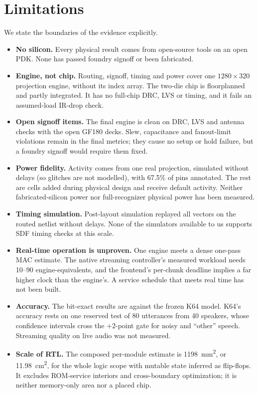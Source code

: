 \section{Limitations}
\label{sec:limitations}

We state the boundaries of the evidence explicitly.

\begin{itemize}
\item \textbf{No silicon.} Every physical result comes from open-source tools on an open PDK. None has passed foundry signoff or been fabricated.
\item \textbf{Engine, not chip.} Routing, signoff, timing and power cover one $1280\times320$ projection engine, without its index array. The two-die chip is floorplanned and partly integrated. It has no full-chip DRC, LVS or timing, and it fails an assumed-load IR-drop check.
\item \textbf{Open signoff items.} The final engine is clean on DRC, LVS and antenna checks with the open GF180 decks. Slew, capacitance and fanout-limit violations remain in the final metrics; they cause no setup or hold failure, but a foundry signoff would require them fixed.
\item \textbf{Power fidelity.} Activity comes from one real projection, simulated without delays (so glitches are not modelled), with 67.5\% of pins annotated. The rest are cells added during physical design and receive default activity. Neither fabricated-silicon power nor full-recognizer physical power has been measured.
\item \textbf{Timing simulation.} Post-layout simulation replayed all vectors on the routed netlist without delays. None of the simulators available to us supports SDF timing checks at this scale.
\item \textbf{Real-time operation is unproven.} One engine meets a dense one-pass MAC estimate. The native streaming controller's measured workload needs 10--90 engine-equivalents, and the frontend's per-chunk deadline implies a far higher clock than the engine's. A service schedule that meets real time has not been built.
\item \textbf{Accuracy.} The bit-exact results are against the frozen K64 model. K64's accuracy rests on one reserved test of 80 utterances from 40 speakers, whose confidence intervals cross the $+2$-point gate for noisy and ``other'' speech. Streaming quality on live audio was not measured.
\item \textbf{Scale of RTL.} The composed per-module estimate is \SI{1198}{mm^2}, or \SI{11.98}{cm^2}, for the whole logic scope with mutable state inferred as flip-flops. It excludes ROM-service interiors and cross-boundary optimization; it is neither memory-only area nor a placed chip.

\end{itemize}
